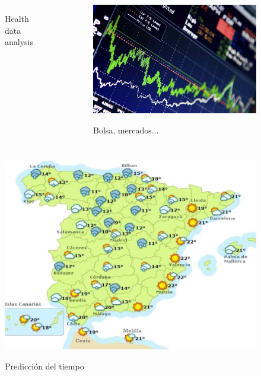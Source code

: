 {\begin{frame}{}
\begin{columns}[c]
\begin{figure}[H]
				\small Health data analysis
			\end{figure}
			
			\begin{figure}[H]
				\centering
				\includegraphics[width=\textwidth]{./Images/bolsa.jpg}
				
				\small Bolsa, mercados...
			\end{figure}
		\end{columns}
		
		\begin{columns}[c]
			\begin{figure}[H]
				\centering
				\includegraphics[width=\textwidth]{./Images/tiempo.jpg}
				
				\small Predicción del tiempo
			\end{figure}
						

\end{columns}
\end{frame}}
